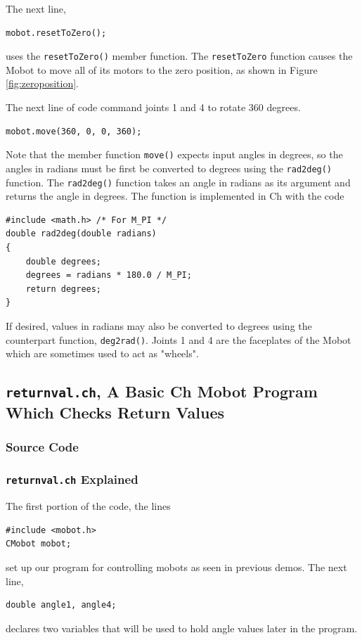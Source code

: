 \documentclass{article}
\begin{document}
The next line,
\begin{verbatim}
mobot.resetToZero();
\end{verbatim}
uses the \texttt{resetToZero()} member function. The
\texttt{resetToZero} function causes the Mobot to move all of its motors to the
zero position, as shown in Figure \ref{fig:zeroposition}.

The next line of code command joints 1 and 4 to rotate 360 degrees.
\begin{verbatim}
mobot.move(360, 0, 0, 360);
\end{verbatim}
Note that the member function \texttt{move()} expects input angles
in degrees, so the angles in radians must be first be converted to degrees 
using the \texttt{rad2deg()} function. The \texttt{rad2deg()} function
takes an angle in radians as its argument and returns the angle in
degrees. The function is implemented in Ch with the code
\begin{verbatim}
#include <math.h> /* For M_PI */
double rad2deg(double radians)
{
    double degrees;
    degrees = radians * 180.0 / M_PI;
    return degrees;
}
\end{verbatim}

If desired, values in radians
may also be converted to degrees using the counterpart function,
\texttt{deg2rad()}.
Joints 1 and 4 are the faceplates
of the Mobot which are sometimes used to act as "wheels".

\subsection{\texttt{returnval.ch}, A Basic Ch Mobot Program Which Checks Return Values}
\subsubsection{Source Code}


\subsubsection{\texttt{returnval.ch} Explained}
The first portion of the code, the lines
\begin{verbatim}
#include <mobot.h>
CMobot mobot;
\end{verbatim}
set up our program for controlling mobots as seen in previous demos. The next line,
\begin{verbatim}
double angle1, angle4;
\end{verbatim}
declares two variables that will be used to hold angle values later in the program.
\end{document}
